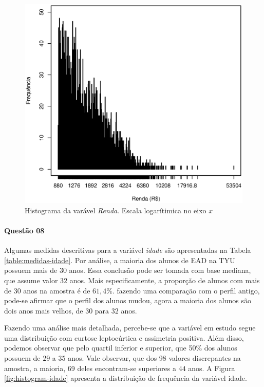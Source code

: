 \documentclass[10pt,a4paper,oneside]{article}
\begin{document}
\begin{figure}[!h]
	\includegraphics[width=\linewidth]{plots/histogram_renda_log.eps}
	\caption{Histograma da varável \textit{Renda}. Escala logarítimica no eixo $x$}
	\label{fig:histograma-renda}
\end{figure}

%
%

\FloatBarrier

\paragraph{Questão 08}

Algumas medidas descritivas para a variável \textit{idade} são apresentadas na Tabela \ref{table:medidas-idade}. Por análise, a maioria dos alunos de EAD na TYU possuem mais de 30 anos. Essa conclusão pode ser tomada com base mediana, que assume valor $32$ anos. Mais especificamente, a proporção de alunos com mais de 30 anos na amostra é de $61,4\%$. fazendo uma comparação com o perfil antigo, pode-se afirmar que o perfil dos alunos mudou, agora a maioria dos alunos são dois anos mais velhos, de $30$ para $32$ anos.

Fazendo uma análise mais detalhada, percebe-se que a variável em estudo segue uma distribuição com curtose leptocúrtica e assimetria positiva. Além disso, podemos observar que pelo quartil inferior e superior, que 50\%  dos alunos possuem de $29$ a $35$ anos. Vale observar, que dos 98 valores discrepantes na amostra, a maioria, 69 deles encontram-se superiores a $44$ anos. A Figura \ref{fig:histogram-idade} apresenta a distribuição de frequência da variável idade.
\end{document}
